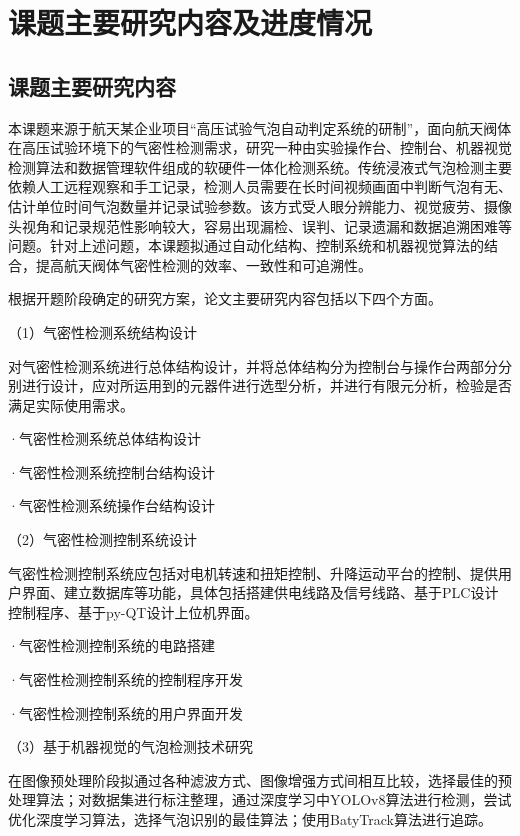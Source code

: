 
\section{课题主要研究内容及进度情况}

\subsection{课题主要研究内容}

本课题来源于航天某企业项目“高压试验气泡自动判定系统的研制”，面向航天阀体在高压试验环境下的气密性检测需求，研究一种由实验操作台、控制台、机器视觉检测算法和数据管理软件组成的软硬件一体化检测系统。传统浸液式气泡检测主要依赖人工远程观察和手工记录，检测人员需要在长时间视频画面中判断气泡有无、估计单位时间气泡数量并记录试验参数。该方式受人眼分辨能力、视觉疲劳、摄像头视角和记录规范性影响较大，容易出现漏检、误判、记录遗漏和数据追溯困难等问题。针对上述问题，本课题拟通过自动化结构、控制系统和机器视觉算法的结合，提高航天阀体气密性检测的效率、一致性和可追溯性。

根据开题阶段确定的研究方案，论文主要研究内容包括以下四个方面。

（1）气密性检测系统结构设计

对气密性检测系统进行总体结构设计，并将总体结构分为控制台与操作台两部分分别进行设计，应对所运用到的元器件进行选型分析，并进行有限元分析，检验是否满足实际使用需求。

·气密性检测系统总体结构设计

·气密性检测系统控制台结构设计

·气密性检测系统操作台结构设计

（2）气密性检测控制系统设计

气密性检测控制系统应包括对电机转速和扭矩控制、升降运动平台的控制、提供用户界面、建立数据库等功能，具体包括搭建供电线路及信号线路、基于PLC设计控制程序、基于py-QT设计上位机界面。

·气密性检测控制系统的电路搭建

·气密性检测控制系统的控制程序开发

·气密性检测控制系统的用户界面开发

（3）基于机器视觉的气泡检测技术研究

在图像预处理阶段拟通过各种滤波方式、图像增强方式间相互比较，选择最佳的预处理算法；对数据集进行标注整理，通过深度学习中YOLOv8算法进行检测，尝试优化深度学习算法，选择气泡识别的最佳算法；使用BatyTrack算法进行追踪。

